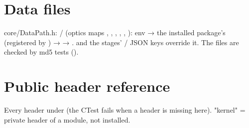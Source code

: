 \section{\texorpdfstring{Data files}{Data files}}\label{developer_manual-03u5farchitecture:38-data-files}
core/\allowbreak{}DataPath.\allowbreak{}h:  /  (optics maps , , , ,
, ): env  → the installed package's  (registered by
) →  → .  and the stages'
/ JSON keys override it. The files are checked by md5 tests ().

\section{\texorpdfstring{Public header reference}{Public header reference}}\label{developer_manual-03u5farchitecture:39-public-header-reference}
Every header under  (the CTest  fails when a header is missing here). "kernel" =
private header of a module, not installed.


